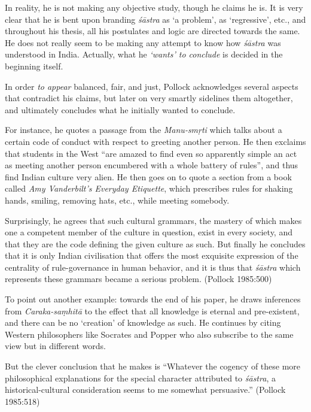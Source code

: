 In reality, he is not making any objective study, though he claims he is. It is very clear that he is bent upon branding {\it śāstra} as `a problem', as `regressive', etc., and throughout his thesis, all his postulates  and logic are directed towards the same. He does not really seem to be making any attempt to know how {\it śāstra} was understood in India. Actually, what he \textsl{`wants' to conclude} is decided in the beginning itself. 

In order {\sl to appear} balanced, fair, and just, Pollock acknowledges several aspects that contradict his claims, but later on very smartly sidelines them altogether, and ultimately concludes what he initially wanted to conclude. 

For instance, he quotes a passage from the {\it Manu-smṛti} which talks about a certain code of conduct with respect to greeting another person. He then exclaims that students in the West ``are amazed to find even so apparently simple an act as meeting another person encumbered with a whole battery of rules'', and thus find Indian culture very alien. He then goes on to quote a section from a book called \textsl{Amy Vanderbilt’s Everyday Etiquette}, which prescribes rules for shaking hands, smiling, removing hats, etc., while meeting somebody. 

Surprisingly, he agrees that such cultural grammars, the mastery of which makes one a competent member of the culture in question, exist in every society, and that they are the code defining the given culture as such. But finally he concludes that it is only Indian civilisation that offers the most exquisite expression of the centrality of rule-governance in human behavior, and it is thus that {\sl śāstra} which represents these grammars became a serious problem. (Pollock 1985:500)

To point out another example: towards the end of his paper, he draws inferences from \textsl{Caraka-saṃhitā} to the effect that all knowledge is eternal and pre-existent, and there can be no `creation' of knowledge as such. He continues by citing Western philosophers like Socrates and Popper who also subscribe to the same view but in different words. 

But the clever conclusion that he makes is ``Whatever the cogency of these more philosophical explanations for the special character attributed to {\it śāstra}, a historical-cultural consideration seems to me somewhat persuasive.'' (Pollock 1985:518) 

